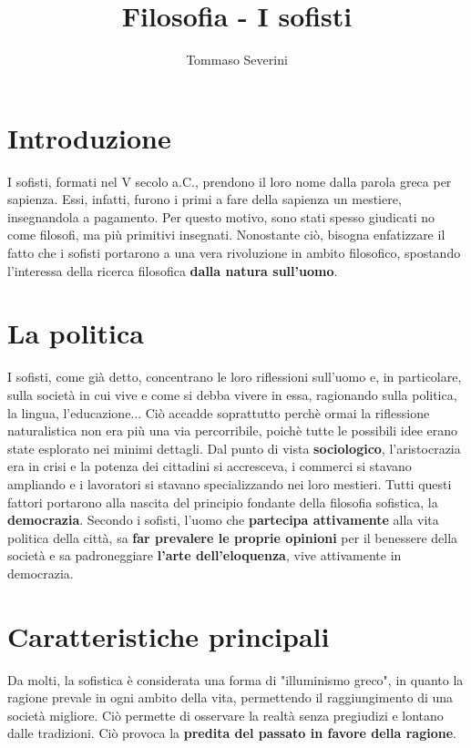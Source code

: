 \documentclass[10pt,a4paper]{article}
\author{Tommaso Severini}
\title{Filosofia - I sofisti}
\begin{document}
	\maketitle
	
	\section{Introduzione}
	
	I sofisti, formati nel V secolo a.C., prendono il loro nome dalla parola greca per sapienza. Essi, infatti, furono i primi a fare della sapienza un mestiere, insegnandola a pagamento. Per questo motivo, sono stati spesso giudicati no come filosofi, ma più primitivi insegnati. Nonostante ciò, bisogna enfatizzare il fatto che i sofisti portarono a una vera rivoluzione in ambito filosofico, spostando l'interessa della ricerca filosofica \textbf{dalla natura sull'uomo}.
	
	\section{La politica}
	
	I sofisti, come già detto, concentrano le loro riflessioni sull'uomo e, in particolare, sulla società in cui vive e come si debba vivere in essa, ragionando sulla politica, la lingua, l'educazione... Ciò accadde soprattutto perchè ormai la riflessione naturalistica non era più una via percorribile, poichè tutte le possibili idee erano state esplorato nei minimi dettagli. Dal punto di vista \textbf{sociologico}, l'aristocrazia era in crisi e la potenza dei cittadini si accresceva, i commerci si stavano ampliando e i lavoratori si stavano specializzando nei loro mestieri. Tutti questi fattori portarono alla nascita del principio fondante della filosofia sofistica, la \textbf{democrazia}. Secondo i sofisti, l'uomo che \textbf{partecipa attivamente} alla vita politica della città, sa \textbf{far prevalere le proprie opinioni} per il benessere della società e sa padroneggiare \textbf{l'arte dell'eloquenza}, vive attivamente in democrazia. 
	
	\section{Caratteristiche principali}
	
	Da molti, la sofistica è considerata una forma di "illuminismo greco", in quanto la ragione prevale in ogni ambito della vita, permettendo il raggiungimento di una società migliore. Ciò permette di osservare la realtà senza pregiudizi e lontano dalle tradizioni. Ciò provoca la \textbf{predita del passato in favore della ragione}.\\
	
\end{document}
